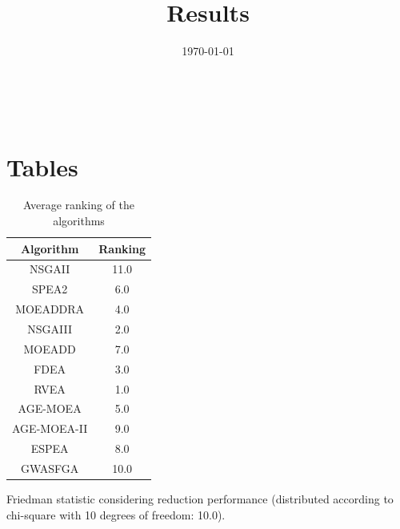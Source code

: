 \documentclass{article}
\title{Results}
\author{}
\date{\today}
\begin{document}
\oddsidemargin 0in \topmargin 0in\maketitle
\
\section{Tables}
\begin{table}[!htp]
\centering
\caption{Average ranking of the algorithms}
\begin{tabular}{c|c}
Algorithm&Ranking\\
\hline
NSGAII&11.0\\
SPEA2&6.0\\
MOEADDRA&4.0\\
NSGAIII&2.0\\
MOEADD&7.0\\
FDEA&3.0\\
RVEA&1.0\\
AGE-MOEA&5.0\\
AGE-MOEA-II&9.0\\
ESPEA&8.0\\
GWASFGA&10.0\\
\end{tabular}
\end{table}


Friedman statistic considering reduction performance (distributed according to chi-square with 10 degrees of freedom: 10.0).
\end{document}
